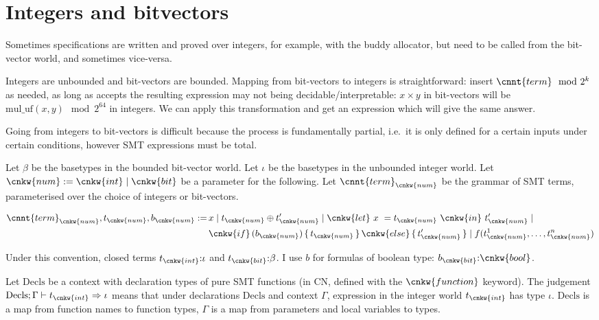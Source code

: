 \section{Integers and bitvectors}

Sometimes specifications are written and proved over integers, for example,
with the buddy allocator, but need to be called from the bit-vector world, and
sometimes vice-versa.

Integers are unbounded and bit-vectors are bounded. Mapping from bit-vectors to
integers is straightforward: insert $\cnnt{term} \mod 2^k$ as needed, as long
as accepts the resulting expression may not being decidable/interpretable: $x
\times y$ in bit-vectors will be $\mathrm{mul\_uf}(x,y) \mod 2^{64}$ in
integers. We can apply this transformation and get an expression which will
give the same answer.

Going from integers to bit-vectors is difficult because the process is
fundamentally partial, i.e.\ it is only defined for a certain inputs under
certain conditions, however SMT expressions must be total.

Let $\beta$ be the basetypes in the bounded bit-vector world. Let $\iota$ be
the basetypes in the unbounded integer world. Let $\cnkw{num} \mathrel{{:}{=}}
\cnkw{int} \mid \cnkw{bit}$ be a parameter for the following. Let
$\cnnt{term}_{\cnkw{num}}$ be the grammar of SMT terms, parameterised over the
choice of integers or bit-vectors.

{\small%
\begin{align*}
\cnnt{term}_{\cnkw{num}}, t_{\cnkw{num}}, b_{\cnkw{num}} \mathrel{{:}{=}}
\, & x \mid t_{\cnkw{num}} \oplus t'_{\cnkw{num}} \mid
\cnkw{let}\ x\ = t_{\cnkw{num}}\ \cnkw{in}\ t'_{\cnkw{num}} \mid \\
& \cnkw{if} \, (b_{\cnkw{num}}) \,\{\, t_{\cnkw{num}} \,\}\, \cnkw{else} \,\{\, t'_{\cnkw{num}} \,\} \mid
f(t^1_{\cnkw{num}}, \ldots, t^n_{\cnkw{num}})
\end{align*}}

Under this convention, closed terms $t_{\cnkw{int}} {:} \iota$ and
$t_{\cnkw{bit}} {:} \beta$. I use $b$ for formulas of boolean type:
$b_{\cnkw{bit}} {:} \cnkw{bool}$.

Let $\mathrm{Decls}$ be a context with declaration types of pure SMT functions
(in CN, defined with the $\cnkw{function}$ keyword). The judgement
$\mathrm{Decls} ; \Gamma \vdash t_{\cnkw{int}} \Rightarrow \iota$  means that
under declarations $\mathrm{Decls}$ and context $\Gamma$, expression in the
integer world $t_{\cnkw{int}}$ has type $\iota$. $\mathrm{Decls}$ is a map from
function names to function types, $\Gamma$ is a map from parameters and local
variables to types.

